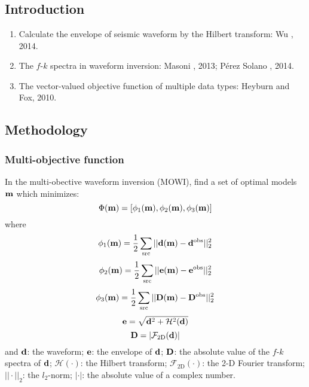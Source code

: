 \renewcommand{\pmk}{Pan\_2020\_GJI\_Multi-objective waveform inversion}
\renewcommand{\prf}{FWI/\pmk.pdf}
\renewcommand{\pti}{Multi-objective waveform inversion of
  shallow seismic wavefields}
\renewcommand{\pay}{Yudi Pan, Lingli Gao and Renat Shigapov, 2020}
\renewcommand{\pjo}{Geophys. J. Int.}
\renewcommand{\pda}{2020/4/28 Tue.}

\section{\pinfo}

\subsection{Introduction}
\begin{enumerate}[\hspace{10mm}*]
  \item Calculate the envelope of seismic waveform by the Hilbert transform:
    Wu \etal, 2014.
  \item The $f$-$k$ spectra in waveform inversion: Masoni \etal, 2013;
    P\'erez Solano \etal, 2014.
  \item The vector-valued objective function of multiple data types:
    Heyburn and Fox, 2010.
\end{enumerate}

\subsection{Methodology}
\subsubsection{Multi-objective function}
In the multi-obective waveform inversion (MOWI),
find a set of optimal models $\mathbf{m}$ which minimizes:
\[ \Phi(\mathbf{m}) = [ \phi_1(\mathbf{m}), \phi_2(\mathbf{m}), \phi_3(\mathbf{m}) ] \]
where
\[ \phi_1(\mathbf{m}) = \frac{1}{2} \sum_\text{src}
  || \mathbf{d}(\mathbf{m}) - \mathbf{d}^\text{obs} ||_2^2 \]
\[ \phi_2(\mathbf{m}) = \frac{1}{2} \sum_\text{src}
  || \mathbf{e}(\mathbf{m}) - \mathbf{e}^\text{obs} ||_2^2 \]
\[ \phi_3(\mathbf{m}) = \frac{1}{2} \sum_\text{src}
  || \mathbf{D}(\mathbf{m}) - \mathbf{D}^\text{obs} ||_2^2 \]
\[ \mathbf{e} = \sqrt{\mathbf{d}^2 + \mathcal H^2(\mathbf{d})} \]
\[ \mathbf{D} = | \mathcal F_\text{2D}(\mathbf{d}) | \]
and $\mathbf{d}$: the waveform;
$\mathbf{e}$: the envelope of $\mathbf{d}$;
$\mathbf{D}$: the absolute value of the $f$-$k$ spectra of $\mathbf{d}$;
$\mathcal H(\cdot)$: the Hilbert transform;
$\mathcal F_\text{2D}(\cdot)$: the 2-D Fourier transform;
$||\cdot||_2$: the $l_2$-norm;
$|\cdot|$: the absolute value of a complex number.

